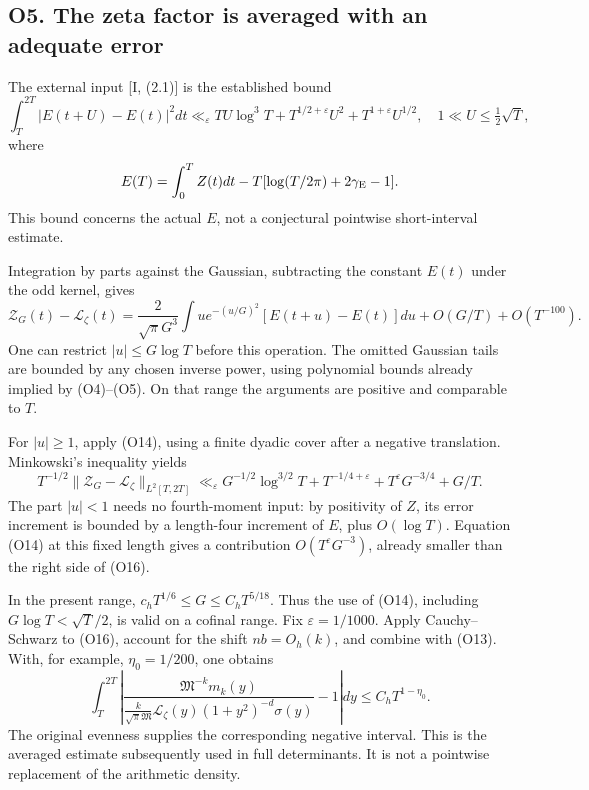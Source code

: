 \documentclass[
  11pt,
]{article}
\begin{document}
\subsection{O5. The zeta factor is averaged with an adequate
error}\label{o5.-the-zeta-factor-is-averaged-with-an-adequate-error}

The external input {[}I, (2.1){]} is the established bound \[
\int_T^{2T}|E(t+U)-E(t)|^2dt
\ll_\varepsilon TU\log^3T+
T^{1/2+\varepsilon}U^2+T^{1+\varepsilon}U^{1/2},
\quad 1\ll U\le\tfrac12\sqrt T,
\tag{O14}
\] where \[
E(T)=\int_0^T Z(t)dt-T[\log(T/2\pi)+2\gamma_{\rm E}-1].
\] This bound concerns the actual \(E\), not a conjectural pointwise
short-interval estimate.

Integration by parts against the Gaussian, subtracting the constant
\(E(t)\) under the odd kernel, gives \[
\mathcal Z_G(t)-\mathcal L_\zeta(t)
=\frac2{\sqrt\pi G^3}\int u e^{-(u/G)^2}
[E(t+u)-E(t)]du+O(G/T)+O(T^{-100}).\tag{O15}
\] One can restrict \(|u|\le G\log T\) before this operation. The
omitted Gaussian tails are bounded by any chosen inverse power, using
polynomial bounds already implied by (O4)--(O5). On that range the
arguments are positive and comparable to \(T\).

For \(|u|\ge1\), apply (O14), using a finite dyadic cover after a
negative translation. Minkowski's inequality yields \[
\boxed{T^{-1/2}\|\mathcal Z_G-\mathcal L_\zeta\|_{L^2[T,2T]}
\ll_\varepsilon
G^{-1/2}\log^{3/2}T+T^{-1/4+\varepsilon}
+T^\varepsilon G^{-3/4}+G/T.}\tag{O16}
\] The part \(|u|<1\) needs no fourth-moment input: by positivity of
\(Z\), its error increment is bounded by a length-four increment of
\(E\), plus \(O(\log T)\). Equation (O14) at this fixed length gives a
contribution \(O(T^\varepsilon G^{-3})\), already smaller than the right
side of (O16).

In the present range, \(c_hT^{1/6}\le G\le C_hT^{5/18}\). Thus the use
of (O14), including \(G\log T<\sqrt T/2\), is valid on a cofinal range.
Fix \(\varepsilon=1/1000\). Apply Cauchy--Schwarz to (O16), account for
the shift \(nb=O_h(k)\), and combine with (O13). With, for example,
\(\eta_0=1/200\), one obtains \[
\boxed{\int_T^{2T}
\left|\frac{\mathfrak M^{-k}m_k(y)}
{\frac{k}{\sqrt\pi\mathfrak M}\mathcal L_\zeta(y)
(1+y^2)^{-d}\sigma(y)}-1\right|dy
\le C_hT^{1-\eta_0}.}\tag{O17}
\] The original evenness supplies the corresponding negative interval.
This is the averaged estimate subsequently used in full determinants. It
is not a pointwise replacement of the arithmetic density.
\end{document}
